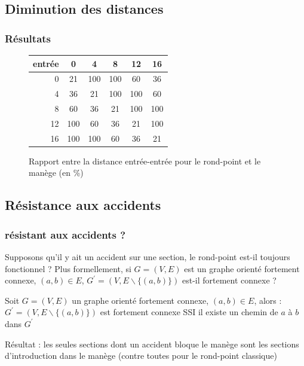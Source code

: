 \documentclass[slidetop,11pt]{beamer}
\begin{document}
	\subsection{Diminution des distances}

%
%	

\begin{frame}
	\frametitle{Résultats}
\begin{figure}
	\caption{Rapport entre la distance entrée-entrée pour le rond-point et le manège (en \%)}
	\begin{center}
	\begin{tabular}{ r|c c c c c}
   entrée & 0 & 4 & 8 & 12 & 16 \\ \hline
0 & 21 & 100 & 100 & 60 & 36 \\
4 & 36 & 21 & 100 & 100 & 60 \\
8 & 60 & 36 & 21 & 100 & 100 \\
12 & 100 & 60 & 36 & 21 & 100 \\
16 & 100 & 100 & 60 & 36 & 21 \\
	\end{tabular}
	\end{center}
\end{figure}
\end{frame}

	\subsection{Résistance aux accidents}

\begin{frame}
	\frametitle{résistant aux accidents ?}
	Supposons qu'il y ait un accident sur une section, le rond-point est-il toujours fonctionnel ? Plus formellement, si $G=(V,E)$ est un graphe orienté fortement connexe, $(a,b) \in E $, $G^\prime = (V,E\backslash \{ (a,b) \})$ est-il fortement connexe ?
\end{frame}

\begin{frame}
	\begin{theorem}
		Soit $G=(V,E)$ un graphe orienté fortement connexe, $(a,b) \in E$, alors :
		$G^\prime = (V,E\backslash \{ (a,b) \})$ est fortement connexe SSI il existe un chemin de $a$ à $b$
		dans $G^\prime$
	\end{theorem}
	Résultat : les seules sections dont un accident bloque le manège sont les sections d'introduction dans le manège (contre toutes pour le rond-point classique)
\end{frame}
\end{document}
